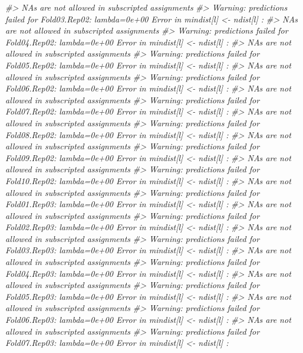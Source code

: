 \documentclass[]{book}
\newenvironment{Shaded}{\begin{snugshade}}{\end{snugshade}}
\newcommand{\CommentTok}[1]{\textcolor[rgb]{0.56,0.35,0.01}{\textit{#1}}}
\begin{document}
\begin{Shaded}
\begin{Highlighting}[]
\CommentTok{#>   NAs are not allowed in subscripted assignments}
\CommentTok{#> Warning: predictions failed for Fold03.Rep02: lambda=0e+00 Error in mindist[l] <- ndist[l] : }
\CommentTok{#>   NAs are not allowed in subscripted assignments}
\CommentTok{#> Warning: predictions failed for Fold04.Rep02: lambda=0e+00 Error in mindist[l] <- ndist[l] : }
\CommentTok{#>   NAs are not allowed in subscripted assignments}
\CommentTok{#> Warning: predictions failed for Fold05.Rep02: lambda=0e+00 Error in mindist[l] <- ndist[l] : }
\CommentTok{#>   NAs are not allowed in subscripted assignments}
\CommentTok{#> Warning: predictions failed for Fold06.Rep02: lambda=0e+00 Error in mindist[l] <- ndist[l] : }
\CommentTok{#>   NAs are not allowed in subscripted assignments}
\CommentTok{#> Warning: predictions failed for Fold07.Rep02: lambda=0e+00 Error in mindist[l] <- ndist[l] : }
\CommentTok{#>   NAs are not allowed in subscripted assignments}
\CommentTok{#> Warning: predictions failed for Fold08.Rep02: lambda=0e+00 Error in mindist[l] <- ndist[l] : }
\CommentTok{#>   NAs are not allowed in subscripted assignments}
\CommentTok{#> Warning: predictions failed for Fold09.Rep02: lambda=0e+00 Error in mindist[l] <- ndist[l] : }
\CommentTok{#>   NAs are not allowed in subscripted assignments}
\CommentTok{#> Warning: predictions failed for Fold10.Rep02: lambda=0e+00 Error in mindist[l] <- ndist[l] : }
\CommentTok{#>   NAs are not allowed in subscripted assignments}
\CommentTok{#> Warning: predictions failed for Fold01.Rep03: lambda=0e+00 Error in mindist[l] <- ndist[l] : }
\CommentTok{#>   NAs are not allowed in subscripted assignments}
\CommentTok{#> Warning: predictions failed for Fold02.Rep03: lambda=0e+00 Error in mindist[l] <- ndist[l] : }
\CommentTok{#>   NAs are not allowed in subscripted assignments}
\CommentTok{#> Warning: predictions failed for Fold03.Rep03: lambda=0e+00 Error in mindist[l] <- ndist[l] : }
\CommentTok{#>   NAs are not allowed in subscripted assignments}
\CommentTok{#> Warning: predictions failed for Fold04.Rep03: lambda=0e+00 Error in mindist[l] <- ndist[l] : }
\CommentTok{#>   NAs are not allowed in subscripted assignments}
\CommentTok{#> Warning: predictions failed for Fold05.Rep03: lambda=0e+00 Error in mindist[l] <- ndist[l] : }
\CommentTok{#>   NAs are not allowed in subscripted assignments}
\CommentTok{#> Warning: predictions failed for Fold06.Rep03: lambda=0e+00 Error in mindist[l] <- ndist[l] : }
\CommentTok{#>   NAs are not allowed in subscripted assignments}
\CommentTok{#> Warning: predictions failed for Fold07.Rep03: lambda=0e+00 Error in mindist[l] <- ndist[l] : }

\end{Highlighting}
\end{Shaded}
\end{document}

